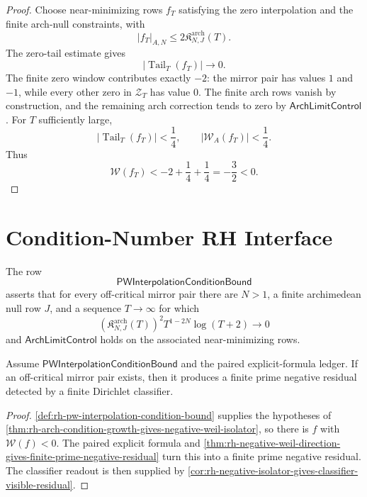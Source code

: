 \begin{proof}
Choose near-minimizing rows $f_T$ satisfying the zero interpolation and
the finite arch-null constraints, with
$$
|f_T|_{A,N}
\le
2\mathfrak K^{\mathrm{arch}}_{N,J}(T).
$$
The zero-tail estimate gives
$$
|\operatorname{Tail}_T(f_T)|\to0.
$$
The finite zero window contributes exactly $-2$: the mirror pair has
values $1$ and $-1$, while every other zero in $\mathcal Z_T$ has value
$0$.  The finite arch rows vanish by construction, and the remaining
arch correction tends to zero by $\mathsf{ArchLimitControl}$.  For $T$
sufficiently large,
$$
|\operatorname{Tail}_T(f_T)|<\frac14,
\qquad
|\mathcal W_A(f_T)|<\frac14.
$$
Thus
$$
\mathcal W(f_T)
<
-2+\frac14+\frac14
=
-\frac32
<
0.
$$
\end{proof}

\section{Condition-Number RH Interface}
\label{sec:rh-condition-number-rh-interface}

\begin{definition}[PWInterpolationConditionBound]
\label{def:rh-pw-interpolation-condition-bound}
The row
$$
\mathsf{PWInterpolationConditionBound}
$$
asserts that for every off-critical mirror pair there are $N>1$, a
finite archimedean null row $J$, and a sequence $T\to\infty$ for which
$$
\left(\mathfrak K^{\mathrm{arch}}_{N,J}(T)\right)^2
T^{1-2N}\log(T+2)\to0
$$
and $\mathsf{ArchLimitControl}$ holds on the associated near-minimizing
rows.
\end{definition}

\begin{theorem}
\label{thm:rh-condition-number-negative-residual-theorem}
Assume $\mathsf{PWInterpolationConditionBound}$ and the paired
explicit-formula ledger.  If an off-critical mirror pair exists, then it
produces a finite prime negative residual detected by a finite
Dirichlet classifier.
\end{theorem}

\begin{proof}
\autoref{def:rh-pw-interpolation-condition-bound} supplies the
hypotheses of
\autoref{thm:rh-arch-condition-growth-gives-negative-weil-isolator}, so
there is $f$ with $\mathcal W(f)<0$.  The paired explicit formula and
\autoref{thm:rh-negative-weil-direction-gives-finite-prime-negative-residual}
turn this into a finite prime negative residual.  The classifier readout
is then supplied by
\autoref{cor:rh-negative-isolator-gives-classifier-visible-residual}.
\end{proof}

